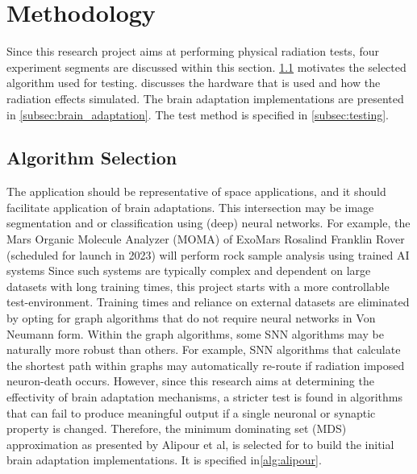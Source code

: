 \section{Methodology}\label{sec:methodology}
Since this research project aims at performing physical radiation tests, four experiment segments are discussed within this section. \cref{subsec:algorithm} motivates the selected algorithm used for testing.  discusses the hardware that is used and how the radiation effects simulated. The brain adaptation implementations are presented in \cref{subsec:brain_adaptation}. The test method is specified in \cref{subsec:testing}.

\subsection{Algorithm Selection}\label{subsec:algorithm}
The application should be representative of space applications, and it should facilitate application of brain adaptations. This intersection may be image segmentation and or classification using (deep) neural networks. For example, the Mars Organic Molecule Analyzer (MOMA) of ExoMars Rosalind Franklin Rover (scheduled for launch in 2023) will perform rock sample analysis using trained AI systems \cite{}%
Since such systems are typically complex and dependent on large datasets with long training times, this project starts with a more controllable test-environment. Training times and reliance on external datasets are eliminated by opting for graph algorithms that do not require neural networks in Von Neumann form. Within the graph algorithms, some SNN algorithms may be naturally more robust than others. For example, SNN algorithms that calculate the shortest path within graphs may automatically re-route if radiation imposed neuron-death occurs. However, since this research aims at determining the effectivity of brain adaptation mechanisms, a stricter test is found in algorithms that can fail to produce meaningful output if a single neuronal or synaptic property is changed. Therefore, the minimum dominating set (MDS) approximation as presented by Alipour et al, is selected \cite{} for to build the initial brain adaptation implementations. It is specified in\cref{alg:alipour}.
